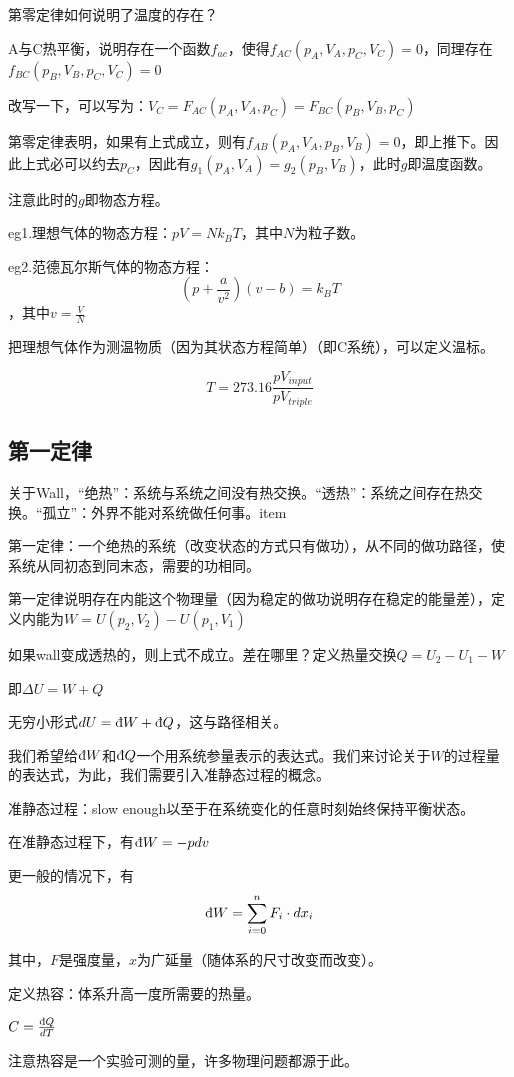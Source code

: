 \documentclass[a4paper, 10pt, openany]{book}%
\begin{document}
第零定律如何说明了温度的存在？

A与C热平衡，说明存在一个函数$f_{ac}$，使得$f_{AC}(p_A,V_A,p_C,V_C)=0$，同理存在$f_{BC}(p_B,V_B,p_C,V_C)=0$

改写一下，可以写为：$V_C=F_{AC}(p_A,V_A,p_C)=F_{BC}(p_B,V_B,p_C)$

第零定律表明，如果有上式成立，则有$f_{AB}(p_A,V_A,p_B,V_B)=0$，即上推下。因此上式必可以约去$p_C$，因此有$g_1(p_A,V_A)=g_2(p_B,V_B)$，此时$g$即温度函数。

注意此时的$g$即物态方程。

eg1.理想气体的物态方程：$pV=Nk_BT$，其中$N$为粒子数。

eg2.范德瓦尔斯气体的物态方程：
$$(p+\frac{a}{v^2})(v-b)=k_BT$$，其中$v=\frac{V}{N}$

把理想气体作为测温物质（因为其状态方程简单）（即C系统），可以定义温标。

$$T=273.16\frac{pV_{input}}{pV_{triple}}$$
\subsection{第一定律}
关于Wall，“绝热”：系统与系统之间没有热交换。“透热”：系统之间存在热交换。“孤立”：外界不能对系统做任何事。item

第一定律：一个绝热的系统（改变状态的方式只有做功），从不同的做功路径，使系统从同初态到同末态，需要的功相同。

第一定律说明存在内能这个物理量（因为稳定的做功说明存在稳定的能量差），定义内能为$W=U(p_2,V_2)-U(p_1,V_1)$

如果wall变成透热的，则上式不成立。差在哪里？定义热量交换$Q=U_2-U_1-W$

即$\Delta U=W+Q$

无穷小形式$dU=\text{\dj}W+\text{\dj}Q$，这与路径相关。

我们希望给$\text{\dj}W$和$\text{\dj}Q$一个用系统参量表示的表达式。我们来讨论关于$W$的过程量的表达式，为此，我们需要引入准静态过程的概念。

准静态过程：slow enough以至于在系统变化的任意时刻始终保持平衡状态。

在准静态过程下，有$\text{\dj}W=-pdv$

更一般的情况下，有$$\text{\dj}W=\sum_{i=0}^nF_i\cdot dx_i$$

其中，$F$是强度量，$x$为广延量（随体系的尺寸改变而改变）。

定义热容：体系升高一度所需要的热量。

$C=\frac{\text{\dj}Q}{dT}$

注意热容是一个实验可测的量，许多物理问题都源于此。
\end{document}
